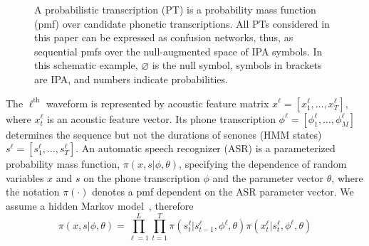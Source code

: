 \begin{figure}
\begin{center}
\end{center}
\caption{A probabilistic transcription (PT) is a probability mass
  function (pmf) over candidate phonetic transcriptions.  All PTs
  considered in this paper can be expressed as confusion networks,
  thus, as sequential pmfs over the null-augmented space of IPA
  symbols.  In this schematic example, $\varnothing$ is the null
  symbol, symbols in brackets are IPA, and numbers indicate
  probabilities.}
  \label{fig:pt}
\end{figure}

The $\ell^{\textrm{th}}$ waveform is represented by acoustic feature
matrix $x^\ell =[x_1^\ell,\ldots,x_T^\ell]$, where $x_t^\ell$ is an
acoustic feature vector.  Its phone transcription
$\phi^\ell=[\phi_1^\ell,\ldots,\phi_M^\ell]$ determines the sequence
but not the durations of senones (HMM states) $s^\ell
=[s_1^\ell,\ldots,s_T^\ell]$.  An automatic speech recognizer (ASR) is
a parameterized probability mass function, $\pi(x,s|\phi,\theta)$,
specifying the dependence of random variables $x$ and $s$ on the phone
transcription $\phi$ and the parameter vector $\theta$, where the
notation $\pi(\cdot)$ denotes a pmf dependent on the ASR parameter
vector.  We assume a hidden Markov model~\cite{Baker75}, therefore
\[
\pi(x,s|\phi,\theta)=\prod_{\ell=1}^L \prod_{t=1}^T
\pi(s_t^\ell|s_{t-1}^\ell,\phi^\ell,\theta)\pi(x_t^\ell|s_t^\ell,\phi^\ell,\theta)
\]
